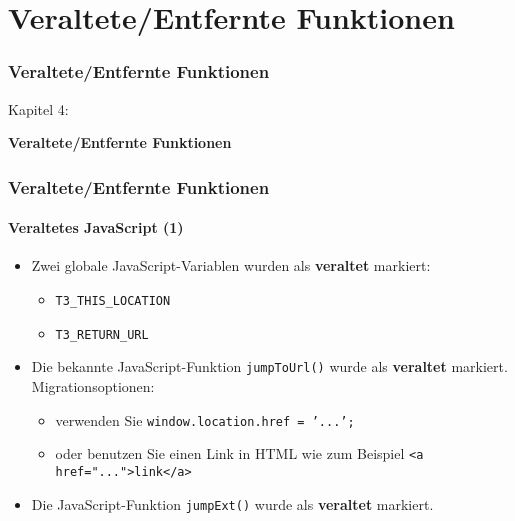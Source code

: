 %

\section{Veraltete/Entfernte Funktionen}
\begin{frame}[fragile]
	\frametitle{Veraltete/Entfernte Funktionen}

	\begin{center}\huge{Kapitel 4:}\end{center}
	\begin{center}\huge{\color{typo3darkgrey}\textbf{Veraltete/Entfernte Funktionen}}\end{center}

\end{frame}


\begin{frame}[fragile]
	\frametitle{Veraltete/Entfernte Funktionen}
	\framesubtitle{Veraltetes JavaScript (1)}

	\begin{itemize}
		\item Zwei globale JavaScript-Variablen wurden als \textbf{veraltet} markiert:

			\begin{itemize}
				\item \texttt{T3\_THIS\_LOCATION}
				\item \texttt{T3\_RETURN\_URL}
			\end{itemize}

		\item Die bekannte JavaScript-Funktion \texttt{jumpToUrl()} wurde als \textbf{veraltet} markiert.
			Migrationsoptionen:

			\begin{itemize}
				\item verwenden Sie \texttt{window.location.href = '...';}
				\item oder benutzen Sie einen Link in HTML wie zum Beispiel \texttt{<a href="...">link</a>}
			\end{itemize}

		\item Die JavaScript-Funktion \texttt{jumpExt()} wurde als \textbf{veraltet} markiert.

	\end{itemize}

\end{frame}


